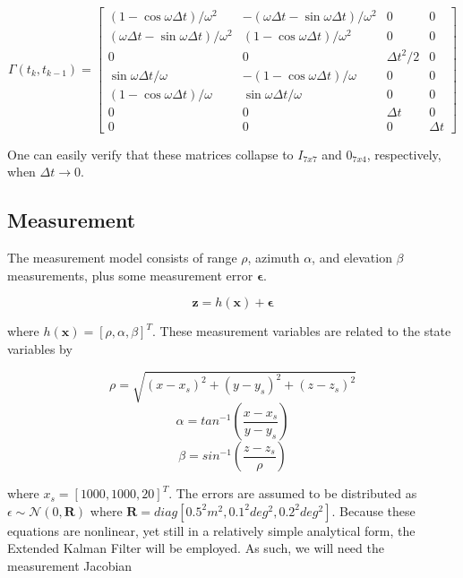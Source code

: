\documentclass{article}
\begin{document}
\begin{equation}\label{eqn:pntm}
	\Gamma(t_k,t_{k-1}) = 
	\begin{bmatrix}
		(1-\cos{\omega \Delta t})/\omega^2 & -(\omega\Delta t-\sin{\omega \Delta t})/\omega^2 & 0 & 0 \\
		(\omega\Delta t-\sin{\omega \Delta t})/\omega^2 & (1-\cos{\omega \Delta t})/\omega^2 & 0 & 0 \\
		0 & 0 & \Delta t^2/2 & 0 \\
		\sin{\omega \Delta t}/\omega & -(1-\cos{\omega \Delta t})/\omega & 0 & 0 \\
		(1-\cos{\omega \Delta t})/\omega & \sin{\omega \Delta t}/\omega & 0 & 0 \\
		0 & 0 & \Delta t & 0 \\
		0 & 0 & 0 & \Delta t
	\end{bmatrix}
\end{equation}

One can easily verify that these matrices collapse to $I_{7x7}$ and $0_{7x4}$, respectively, when $\Delta t \rightarrow 0$.

\subsection{Measurement}

The measurement model consists of range $\rho$, azimuth $\alpha$, and elevation $\beta$ measurements, plus some measurement error $\mathbf{\epsilon}$.

\begin{equation}\label{eqn:measurement_model}
	\mathbf{z} = h(\mathbf{x}) + \mathbf{\epsilon}
\end{equation}

where $h(\mathbf{x}) = [\rho, \alpha, \beta]^T$. These measurement variables are related to the state variables by

\begin{equation}\label{eqn:range}
	\rho = \sqrt{(x-x_s)^2 + (y-y_s)^2 + (z-z_s)^2}
\end{equation}
\begin{equation}\label{eqn:azimuth}
	\alpha = tan^{-1}(\frac{x-x_s}{y-y_s})
\end{equation}
\begin{equation}\label{eqn:range}
	\beta = sin^{-1}(\frac{z-z_s}{\rho})
\end{equation}

where $x_s = [1000, 1000, 20]^T$. The errors are assumed to be distributed as $\epsilon \sim \mathcal{N}(0, \mathbf{R})$ where $\mathbf{R} = diag[0.5^2 m^2, 0.1^2 deg^2, 0.2^2 deg^2]$. Because these equations are nonlinear, yet still in a relatively simple analytical form, the Extended Kalman Filter will be employed. As such, we will need the measurement Jacobian
\end{document}

